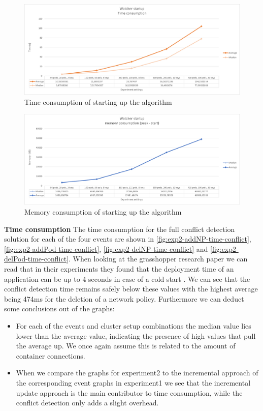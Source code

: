 \begin{figure}[H]
    \centering
    \includegraphics[width=\textwidth]{images/experiment2/watcher-startup-time.png}
    \caption{Time consumption of starting up the algorithm}
    \label{fig:exp2-startup-time}
\end{figure}
\begin{figure}[H]
    \centering
    \includegraphics[width=\textwidth]{images/experiment2/watcher-startup-memory.png}
    \caption{Memory consumption of starting up the algorithm}
    \label{fig:exp2-startup-memory}
\end{figure}



\textbf{Time consumption}
\newline The time consumption for the full conflict detection solution for each of the four events are shown in \autoref{fig:exp2-addNP-time-conflict}, \autoref{fig:exp2-addPod-time-conflict}, \autoref{fig:exp2-delNP-time-conflict} and \autoref{fig:exp2-delPod-time-conflict}. When looking at the grasshopper research paper we can read that in their experiments they found that the deployment time of an application can be up to 4 seconds in case of a cold start \cite{grasshopper}. We can see that the conflict detection time remains safely below these values with the highest average being 474ms for the deletion of a network policy. Furthermore we can deduct some conclusions out of the graphs:
\begin{itemize}
    \item For each of the events and cluster setup combinations the median value lies lower than the average value, indicating the presence of high values that pull the average up. We once again assume this is related to the amount of container connections.
    \item When we compare the graphs for experiment2 to the incremental approach of the corresponding event graphs in experiment1 we see that the incremental update approach is the main contributor to time consumption, while the conflict detection only adds a slight overhead.
\end{itemize}


